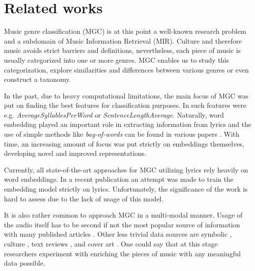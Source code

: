 \section{Related works}\label{related_work}

Music genre classification (MGC) is at this point a well-known research problem and a subdomain of Music Information Retrieval (MIR). Culture and therefore music avoids strict barriers and definitions, nevertheless, each piece of music is usually categorized into one or more genres. MGC enables us to study this categorization, explore similarities and differences between various genres or even construct a taxonomy. 

In the past, due to heavy computational limitations, the main focus of MGC was put on finding the best features for classification purposes. In \cite{oldFeatures} such features were e.g. \textit{AverageSyllablesPerWord} or \textit{SentenceLengthAverage}. Naturally, word embedding played an important role in extracting information from lyrics and the use of simple methods like \textit{bag-of-words} can be found in various papers \cite{mgc_example_1, liang2011music}. With time, an increasing amount of focus was put strictly on embeddings themselves, developing novel and improved representations. 

Currently, all state-of-the-art approaches for MGC utilizing lyrics rely heavily on word embeddings. In a recent publication \cite{musicWordEmbed} an attempt was made to train the embedding model strictly on lyrics. Unfortunately, the significance of the work is hard to assess due to the lack of usage of this model.

It is also rather common to approach MGC in a multi-modal manner. Usage of the audio itself has to be second if not the most popular source of information with many published articles \cite{audio_1dcnn, audio_attention, audio_reviews_cover, oldFeatures, oldAudio}. Other less trivial data sources are symbolic \cite{symbolic}, culture \cite{oldFeatures}, text reviews \cite{audio_reviews_cover}, and cover art \cite{audio_reviews_cover}. One could say that at this stage researchers experiment with enriching the pieces of music with any meaningful data possible.

